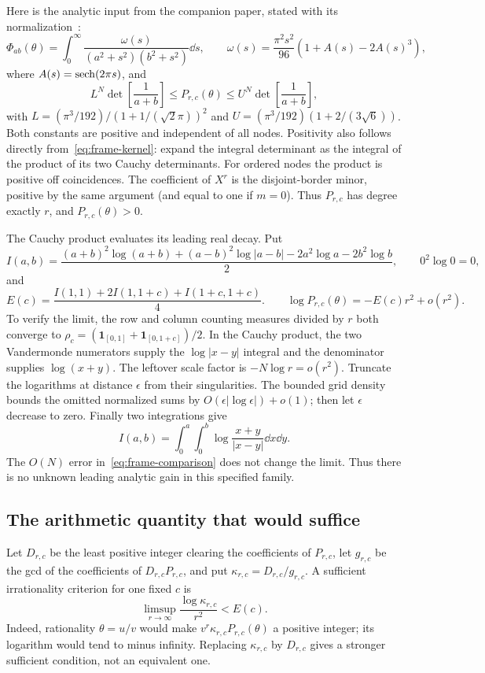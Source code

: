 Here is the analytic input from the companion paper, stated with its
normalization~\cite[Proposition 3.1 and Theorem 3.3]{Main}:
\begin{equation}\label{eq:frame-kernel}
 \Phi_{ab}(\theta)=\int_0^\infty
       \frac{\omega(s)}{(a^2+s^2)(b^2+s^2)}\dd s,\qquad
 \omega(s)=\frac{\pi^2s^2}{96}(1+A(s)-2A(s)^3),
\end{equation}
where $A(s)=\operatorname{sech}(2\pi s)$, and
\begin{equation}\label{eq:frame-comparison}
 L^N\det\left[\frac1{a+b}\right]
 \leq P_{r,c}(\theta)\leq U^N\det\left[\frac1{a+b}\right],
\end{equation}
with $L=(\pi^3/192)/(1+1/(\sqrt2\pi))^2$ and
$U=(\pi^3/192)(1+2/(3\sqrt6))$.
Both constants are positive and independent of all nodes. Positivity
also follows directly from~\eqref{eq:frame-kernel}: expand the
integral determinant as the integral of the product of its two Cauchy
determinants. For ordered nodes the product is positive off coincidences.
The coefficient of $X^r$ is the disjoint-border minor, positive by the
same argument (and equal to one if $m=0$). Thus $P_{r,c}$ has degree
exactly $r$, and $P_{r,c}(\theta)>0$.

The Cauchy product evaluates its leading real decay. Put
\[
 I(a,b)=\frac{(a+b)^2\log(a+b)+(a-b)^2\log|a-b|
                    -2a^2\log a-2b^2\log b}{2},
 \qquad 0^2\log0=0,
\]
and
\begin{equation}\label{eq:frame-energy}
 E(c)=\frac{I(1,1)+2I(1,1+c)+I(1+c,1+c)}4.
 \qquad
 \log P_{r,c}(\theta)=-E(c)r^2+o(r^2).
\end{equation}
To verify the limit, the row and column counting measures divided by
$r$ both converge to
$\rho_c=(\mathbf1_{[0,1]}+\mathbf1_{[0,1+c]})/2$.
In the Cauchy product, the two Vandermonde numerators supply the
$\log|x-y|$ integral and the denominator supplies $\log(x+y)$.
The leftover scale factor is $-N\log r=o(r^2)$.
Truncate the logarithms at distance $\epsilon$ from their singularities.
The bounded grid density bounds the omitted normalized sums by
$O(\epsilon|\log\epsilon|)+o(1)$; then let $\epsilon$ decrease to zero.
Finally two integrations give
\[
 I(a,b)=\int_0^a\int_0^b\log\frac{x+y}{|x-y|}\dd x\dd y.
\]
The $O(N)$ error in~\eqref{eq:frame-comparison} does not change the limit.
Thus there is no unknown leading analytic gain in this specified family.

\subsection{The arithmetic quantity that would suffice}
Let $D_{r,c}$ be the least positive integer clearing the coefficients
of $P_{r,c}$, let $g_{r,c}$ be the gcd of the coefficients of
$D_{r,c}P_{r,c}$, and put $\kappa_{r,c}=D_{r,c}/g_{r,c}$.
A sufficient irrationality criterion for one fixed $c$ is
\begin{equation}\label{eq:frame-target}
 \limsup_{r\to\infty}\frac{\log\kappa_{r,c}}{r^2}<E(c).
\end{equation}
Indeed, rationality $\theta=u/v$ would make
$v^r\kappa_{r,c}P_{r,c}(\theta)$ a positive integer; its logarithm
would tend to minus infinity. Replacing $\kappa_{r,c}$ by $D_{r,c}$
gives a stronger sufficient condition, not an equivalent one.

